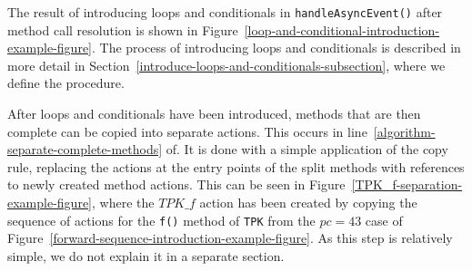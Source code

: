 The result of introducing loops and conditionals in
\texttt{handleAsyncEvent()} after method call resolution is shown in
Figure~\ref{loop-and-conditional-introduction-example-figure}.
The process of introducing loops and conditionals is described in more
detail in Section~\ref{introduce-loops-and-conditionals-subsection},
where we define the  procedure.

After loops and conditionals have been introduced, methods that are
then complete can be copied into separate actions.
This occurs in line~\ref{algorithm-separate-complete-methods}
of.
It is done with a simple application of the copy rule, replacing the
actions at the entry points of the split methods with references to
newly created method actions.
This can be seen in Figure~\ref{TPK_f-separation-example-figure},
where the $TPK\_f$ action has been created by copying the sequence of
actions for the \texttt{f()} method of \texttt{TPK} from the $pc = 43$
case of Figure~\ref{forward-sequence-introduction-example-figure}.
%
As this step is relatively simple, we do not explain it in a separate
section.
\begin{figure}[tp!]
  \setlength{\zedindent}{0cm}
  \setlength{\zedtab}{0.3cm}
  \setlength{\zedleftsep}{0cm}
  \setlength{\abovedisplayskip}{0cm}
  \setlength{\belowdisplayskip}{0cm}
\end{figure}

